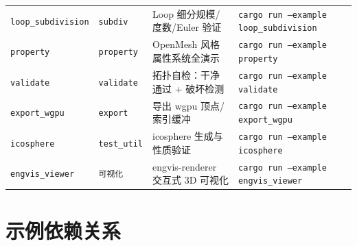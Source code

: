 \documentclass[11pt,a4paper]{article}
\begin{document}
\begin{center}
\begin{tabular}{@{}p{3.4cm}p{2.0cm}p{5.2cm}p{5.4cm}@{}}
  \texttt{loop\_subdivision}         & \texttt{subdiv}     & Loop 细分规模/度数/Euler 验证 & \texttt{cargo run --example loop\_subdivision} \\
  \texttt{property}                  & \texttt{property}   & OpenMesh 风格属性系统全演示   & \texttt{cargo run --example property} \\
  \texttt{validate}                  & \texttt{validate}   & 拓扑自检：干净通过 + 破坏检测 & \texttt{cargo run --example validate} \\
  \texttt{export\_wgpu}              & \texttt{export}     & 导出 wgpu 顶点/索引缓冲       & \texttt{cargo run --example export\_wgpu} \\
  \texttt{icosphere}                 & \texttt{test\_util} & icosphere 生成与性质验证     & \texttt{cargo run --example icosphere} \\
  \texttt{engvis\_viewer}            & \texttt{可视化}     & engvis-renderer 交互式 3D 可视化 & \texttt{cargo run --example engvis\_viewer} \\
  \bottomrule
\end{tabular}
\end{center}

\section{示例依赖关系}
\end{document}
